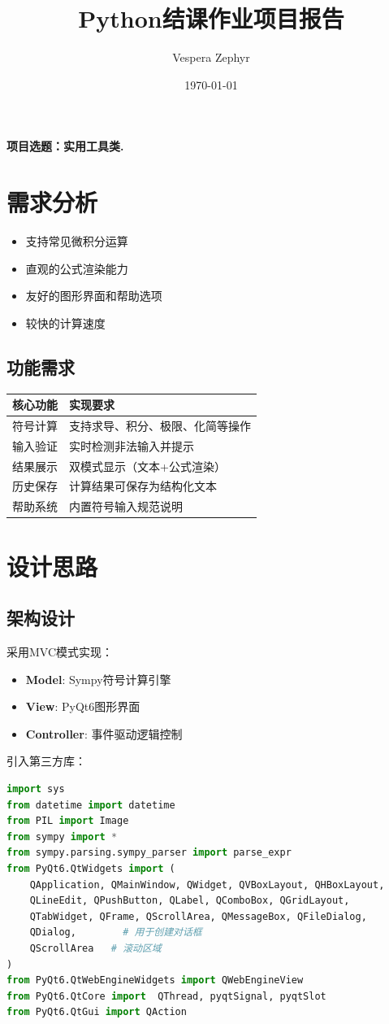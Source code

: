 \documentclass[UTF8,12pt]{ctexart}
\title{\textbf{Python结课作业项目报告}}
\author{Vespera Zephyr}
\date{\today}
\begin{document}
	\maketitle
	\textbf{\large 项目选题：实用工具类. }
	\tableofcontents
	\section{需求分析}
	\begin{itemize}
		\item 支持常见微积分运算
		\item 直观的公式渲染能力
		\item 友好的图形界面和帮助选项
		\item 较快的计算速度
	\end{itemize}
	
	\subsection{功能需求}
	\begin{tabular}{|l|l|}
		\hline
		\textbf{核心功能} & \textbf{实现要求} \\ 
		\hline
		符号计算 & 支持求导、积分、极限、化简等操作 \\
		输入验证 & 实时检测非法输入并提示 \\
		结果展示 & 双模式显示（文本+公式渲染） \\
		历史保存 & 计算结果可保存为结构化文本 \\
		帮助系统 & 内置符号输入规范说明 \\
		\hline
	\end{tabular}
	
	\section{设计思路}
	\subsection{架构设计}
	采用MVC模式实现：
	\begin{itemize}
		\item \textbf{Model}: Sympy符号计算引擎
		\item \textbf{View}: PyQt6图形界面
		\item \textbf{Controller}: 事件驱动逻辑控制
	\end{itemize}
	引入第三方库：
	\begin{lstlisting}[language=Python]
import sys
from datetime import datetime
from PIL import Image
from sympy import *
from sympy.parsing.sympy_parser import parse_expr
from PyQt6.QtWidgets import (
	QApplication, QMainWindow, QWidget, QVBoxLayout, QHBoxLayout,
	QLineEdit, QPushButton, QLabel, QComboBox, QGridLayout,
	QTabWidget, QFrame, QScrollArea, QMessageBox, QFileDialog,
	QDialog,        # 用于创建对话框
	QScrollArea   # 滚动区域
)
from PyQt6.QtWebEngineWidgets import QWebEngineView
from PyQt6.QtCore import  QThread, pyqtSignal, pyqtSlot
from PyQt6.QtGui import QAction
	\end{lstlisting}
	
\end{document}
